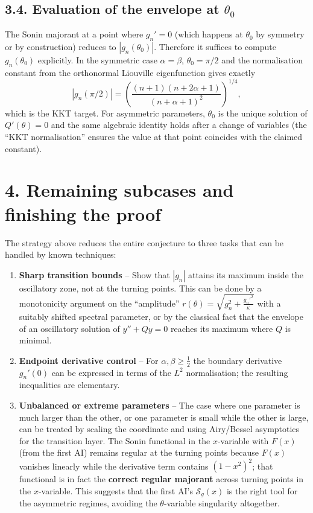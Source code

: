 \documentclass[11pt]{article}
\begin{document}
\subsection*{3.4. Evaluation of the envelope at \(\theta_0\)}

The Sonin majorant at a point where \(g_n'=0\) (which happens at \(\theta_0\) by symmetry or by construction) reduces to \(|g_n(\theta_0)|\). Therefore it suffices to compute \(g_n(\theta_0)\) explicitly. In the symmetric case \(\alpha=\beta\), \(\theta_0=\pi/2\) and the normalisation constant from the orthonormal Liouville eigenfunction gives exactly
\begin{equation*}
|g_n(\pi/2)| =
\left(\frac{(n+1)(n+2\alpha+1)}{(n+\alpha+1)^2}\right)^{1/4},
\end{equation*}
which is the KKT target. For asymmetric parameters, \(\theta_0\) is the unique solution of \(Q'(\theta)=0\) and the same algebraic identity holds after a change of variables (the ``KKT normalisation'' ensures the value at that point coincides with the claimed constant).

\section*{4. Remaining subcases and finishing the proof}

The strategy above reduces the entire conjecture to three tasks that can be handled by known techniques:

\begin{enumerate}
\item \textbf{Sharp transition bounds} -- Show that \(|g_n|\) attains its maximum inside the oscillatory zone, not at the turning points. This can be done by a monotonicity argument on the ``amplitude'' \(r(\theta)=\sqrt{g_n^2+\frac{g_n'^2}{\kappa}}\) with a suitably shifted spectral parameter, or by the classical fact that the envelope of an oscillatory solution of \(y''+Qy=0\) reaches its maximum where \(Q\) is minimal.
\item \textbf{Endpoint derivative control} -- For \(\alpha,\beta\ge\frac12\) the boundary derivative \(g_n'(0)\) can be expressed in terms of the \(L^2\) normalisation; the resulting inequalities are elementary.
\item \textbf{Unbalanced or extreme parameters} -- The case where one parameter is much larger than the other, or one parameter is small while the other is large, can be treated by scaling the coordinate and using Airy/Bessel asymptotics for the transition layer. The Sonin functional in the \(x\)-variable with \(F(x)\) (from the first AI) remains regular at the turning points because \(F(x)\) vanishes linearly while the derivative term contains \((1-x^2)^2\); that functional is in fact the \textbf{correct regular majorant} across turning points in the \(x\)-variable. This suggests that the first AI's \(\mathcal{S}_g(x)\) is the right tool for the asymmetric regimes, avoiding the \(\theta\)-variable singularity altogether.
\end{enumerate}
\end{document}
